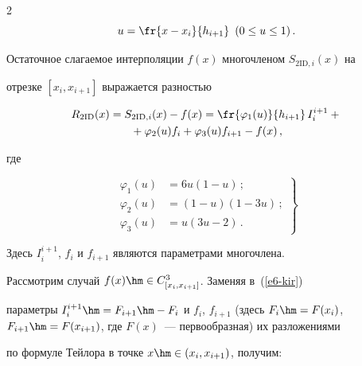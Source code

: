 \begin{multicols}{2}
$$


u=\fr{x-x_i}{h_{i+1}}\enskip (0\leq u\leq 1)\,.


$$


  


  Остаточное слагаемое интерполяции $f(x)$ многочленом $S_{2\mathrm{ID},i}(x)$ на 


отрезке $[x_i,x_{i+1}]$ выражается разностью


  \begin{multline}


  R_{2\mathrm{ID}}(x) =S_{2\mathrm{ID},i}(x)-f(x) 


=\fr{\varphi_1(u)}{h_{i+1}}\,I_i^{i+1}+{}\\


{}+\varphi_2(u)f_i +\varphi_3(u)f_{i+1}-f(x)\,,


  \label{e6-kir}


  \end{multline}


      где 


      \begin{equation}


      \left.


      \begin{array}{rl}


      \varphi_1(u) &= 6u(1-u)\,;\\[9pt]


      \varphi_2(u) &= (1-u)(1-3u)\,;\\[9pt]


      \varphi_3(u) &= u(3u-2)\,.


      \end{array}


      \right\}


      \label{e7-kir}


      \end{equation}


    Здесь $I_i^{i+1}$, $f_i$ и $f_{i+1}$ являются параметрами мно\-го\-члена.


  


  Рассмотрим случай $f(x)\hm\in C^3_{[x_i,x_{i+1}]}$. Заменяя в~(\ref{e6-kir}) 


параметры $I_i^{i+1}\hm= F_{i+1}\hm- F_i$ и $f_i$, $f_{i+1}$ (здесь $F_i\hm= 


F(x_{i})$, $F_{i+1}\hm= F(x_{i+1})$, где $F(x)$~--- первообразная) их разложениями 


по формуле Тейлора в точке $x\hm\in (x_i,x_{i+1})$, получим: 



\end{multicols}
